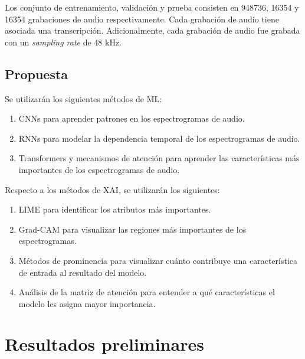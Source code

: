 \documentclass[conference]{IEEEtran}
\begin{document}
Los conjunto de entrenamiento, validación y prueba consisten en 948736, 16354 y 16354 grabaciones de audio respectivamente. Cada grabación de audio tiene asociada una transcripción. Adicionalmente, cada grabación de audio fue grabada con un \textit{sampling rate} de 48 kHz.



\subsection{Propuesta}

Se utilizarán los siguientes métodos de ML:

\begin{enumerate}
    \item CNNs para aprender patrones en los espectrogramas de audio.
    \item RNNs para modelar la dependencia temporal de los espectrogramas de audio.
    \item Transformers y mecanismos de atención \cite{vaswani2023attention} para aprender las características más importantes de los espectrogramas de audio.
\end{enumerate}

Respecto a los métodos de XAI, se utilizarán los siguientes:

\begin{enumerate}
    \item LIME \cite{ribeiro2016why} para identificar los atributos más importantes.
    \item Grad-CAM \cite{DBLP:journals/corr/SelvarajuDVCPB16} para visualizar las regiones más importantes de los espectrogramas.
    \item Métodos de prominencia para visualizar cuánto contribuye una característica de entrada al resultado del modelo.
    \item Análisis de la matriz de atención para entender a qué características el modelo les asigna mayor importancia.
\end{enumerate}

\section{Resultados preliminares}

\printbibliography
\end{document}

